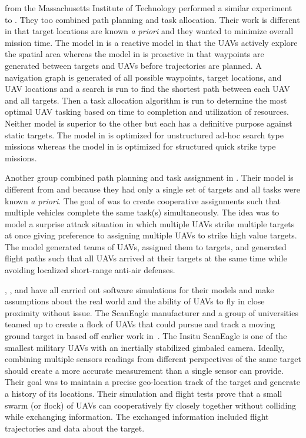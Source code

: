 \textcite{bellingham} from the Massachusetts Institute of Technology performed a similar experiment to \textcite{jin}.   They too combined path planning and task allocation.  Their work is different in that target locations are known \textit{a priori} and they wanted to minimize overall mission time.  The model in \textcite{jin} is a reactive model in that the UAVs actively explore the spatial area whereas the model in \textcite{bellingham} is proactive in that waypoints are generated between targets and UAVs before trajectories are planned.  A navigation graph is generated of all possible waypoints, target locations, and UAV locations and a search is run to find the shortest path between each UAV and all targets.  Then a task allocation algorithm is run to determine the most optimal UAV tasking based on time to completion and utilization of resources.  Neither model is superior to the other but each has a definitive purpose against static targets.  The model in \textcite{jin} is optimized for unstructured ad-hoc search type missions whereas the model in \textcite{bellingham} is optimized for structured quick strike type missions.

Another group combined path planning and task assignment in \textcite{beard}.  Their model is different from \textcite{jin} and \textcite{bellingham} because they had only a single set of targets and all tasks were known \textit{a priori}.  The goal of \textcite{beard} was to create cooperative assignments such that multiple vehicles complete the same task(s) simultaneously.  The idea was to model a surprise attack situation in which multiple UAVs strike multiple targets at once giving preference to assigning multiple UAVs to strike high value targets.  The model generated teams of UAVs, assigned them to targets, and generated flight paths such that all UAVs arrived at their targets at the same time while avoiding localized short-range anti-air defenses.



\textcite{jin}, \textcite{bellingham}, and \textcite{beard} have all carried out software simulations for their models and make assumptions about the real world and the ability of UAVs to fly in close proximity without issue.  The ScanEagle manufacturer \textcite{insitu_brochure} and a group of universities teamed up to create a flock of UAVs that could pursue and track a moving ground target in \textcite{wheeler} based off earlier work in~\textcite{wise_rolf}.  The Insitu ScanEagle is one of the smallest military UAVs with an inertially stabilized gimbaled camera.  Ideally, combining multiple sensors readings from different perspectives of the same target should create a more accurate measurement than a single sensor can provide.  Their goal was to maintain a precise geo-location track of the target and generate a history of its locations.  Their simulation and flight tests prove that a small swarm (or flock) of UAVs can cooperatively fly closely together without colliding while exchanging information.  The exchanged information included flight trajectories and data about the target. 


